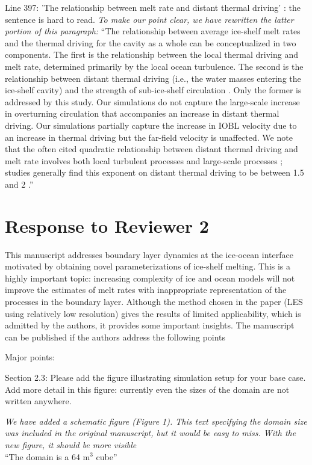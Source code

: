 \documentclass[tc, manuscript]{copernicus}
\begin{document}
Line 397: 'The relationship between melt rate and distant thermal driving' : the sentence is hard to read.
\textit{To make our point clear, we have rewritten the latter portion of this paragraph:}
``The relationship between average ice-shelf melt rates and the thermal driving for the cavity as a whole can be conceptualized in two components. The first is the relationship between the local thermal driving and melt rate, determined primarily by the local ocean turbulence. The second is the relationship between distant thermal driving (i.e., the water masses entering the ice-shelf cavity) and the strength of sub-ice-shelf circulation \citep{holland_response_2008}. Only the former is addressed by this study. Our simulations do not capture the large-scale increase in overturning circulation that accompanies an increase in distant thermal driving. Our simulations partially capture the increase in IOBL velocity due to an increase in thermal driving but the far-field velocity is unaffected. We note that the often cited quadratic relationship between distant thermal driving and melt rate involves both local turbulent processes and large-scale processes \citep{holland_response_2008}; studies generally find this exponent on distant thermal driving to be between 1.5 and 2 \citep{favier_assessment_2019, jourdain_ocean_2017, little_how_2009}.''


\section{Response to Reviewer 2}

This manuscript addresses boundary layer dynamics at the ice-ocean interface motivated by obtaining novel parameterizations of ice-shelf melting. This is a highly important topic: increasing complexity of ice and ocean models will not improve the estimates of melt rates with inappropriate representation of the processes in the boundary layer. Although the method chosen in the paper (LES using relatively low resolution) gives the results of limited applicability, which is admitted by the authors, it provides some important insights. The manuscript can be published if the authors address the following points

Major points:

Section 2.3: Please add the figure illustrating simulation setup for your base case. Add more detail in this figure: currently even the sizes of the domain are not written anywhere.

\textit{We have added a schematic figure (Figure 1). This text specifying the domain size was included in the original manuscript, but it would be easy to miss. With the new figure, it should be more visible}\\
``The domain is a 64 m$^3$ cube''
\end{document}
